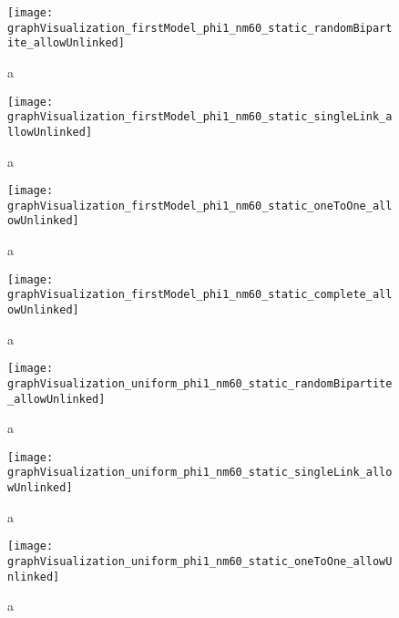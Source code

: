 \begin{figure}
  \centering
  \texttt{[image: graphVisualization\_firstModel\_phi1\_nm60\_static\_randomBipartite\_allowUnlinked]}
  \caption{a}
  \label{fig:graphVisualization_firstModel_phi1_nm60_static_randomBipartite_allowUnlinked}
\end{figure}

\begin{figure}
  \centering
  \texttt{[image: graphVisualization\_firstModel\_phi1\_nm60\_static\_singleLink\_allowUnlinked]}
  \caption{a}
  \label{fig:graphVisualization_firstModel_phi1_nm60_static_singleLink_allowUnlinked}
\end{figure}

\begin{figure}
  \centering
  \texttt{[image: graphVisualization\_firstModel\_phi1\_nm60\_static\_oneToOne\_allowUnlinked]}
  \caption{a}
  \label{fig:graphVisualization_firstModel_phi1_nm60_static_oneToOne_allowUnlinked}
\end{figure}

\begin{figure}
  \centering
  \texttt{[image: graphVisualization\_firstModel\_phi1\_nm60\_static\_complete\_allowUnlinked]}
  \caption{a}
  \label{fig:graphVisualization_firstModel_phi1_nm60_static_complete_allowUnlinked}
\end{figure}

\begin{figure}
  \centering
  \texttt{[image: graphVisualization\_uniform\_phi1\_nm60\_static\_randomBipartite\_allowUnlinked]}
  \caption{a}
  \label{fig:graphVisualization_uniform_phi1_nm60_static_randomBipartite_allowUnlinked}
\end{figure}

\begin{figure}
  \centering
  \texttt{[image: graphVisualization\_uniform\_phi1\_nm60\_static\_singleLink\_allowUnlinked]}
  \caption{a}
  \label{fig:graphVisualization_uniform_phi1_nm60_static_singleLink_allowUnlinked}
\end{figure}

\begin{figure}
  \centering
  \texttt{[image: graphVisualization\_uniform\_phi1\_nm60\_static\_oneToOne\_allowUnlinked]}
  \caption{a}
  \label{fig:graphVisualization_uniform_phi1_nm60_static_oneToOne_allowUnlinked}
\end{figure}

